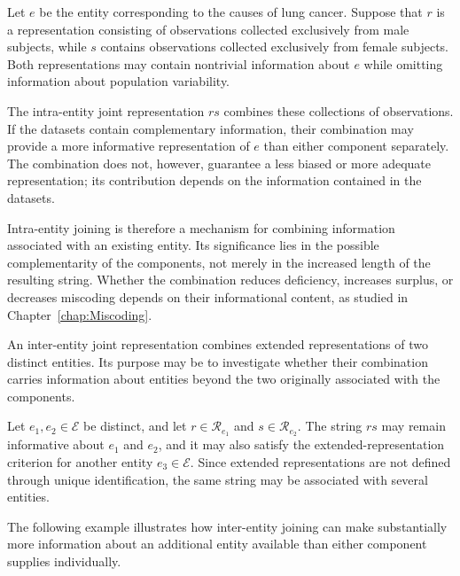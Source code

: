 \begin{example}
\label{ex:lung_cancer_joint}
Let $e$ be the entity corresponding to the causes of lung cancer. Suppose that $r$ is a representation consisting of observations collected exclusively from male subjects, while $s$ contains observations collected exclusively from female subjects. Both representations may contain nontrivial information about $e$ while omitting information about population variability.

The intra-entity joint representation $rs$ combines these collections of observations. If the datasets contain complementary information, their combination may provide a more informative representation of $e$ than either component separately. The combination does not, however, guarantee a less biased or more adequate representation; its contribution depends on the information contained in the datasets.
\end{example}

Intra-entity joining is therefore a mechanism for combining information associated with an existing entity. Its significance lies in the possible complementarity of the components, not merely in the increased length of the resulting string. Whether the combination reduces deficiency, increases surplus, or decreases miscoding depends on their informational content, as studied in Chapter~\ref{chap:Miscoding}.

An inter-entity joint representation combines extended representations of two distinct entities. Its purpose may be to investigate whether their combination carries information about entities beyond the two originally associated with the components.

Let $e_1,e_2\in\mathcal{E}$ be distinct, and let $r\in\mathcal{R}_{e_1}$ and $s\in\mathcal{R}_{e_2}$. The string $rs$ may remain informative about $e_1$ and $e_2$, and it may also satisfy the extended-representation criterion for another entity $e_3\in\mathcal{E}$. Since extended representations are not defined through unique identification, the same string may be associated with several entities.

The following example illustrates how inter-entity joining can make substantially more information about an additional entity available than either component supplies individually.

